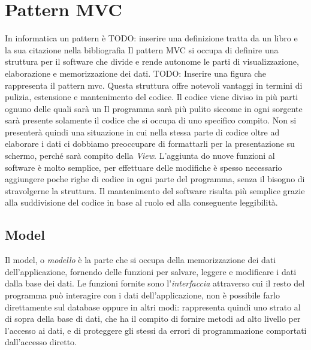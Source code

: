 \section{Pattern MVC}\label{sec:mvc}
In informatica un pattern è TODO: inserire una definizione tratta da un libro e la sua citazione nella bibliografia
Il pattern MVC si occupa di definire una struttura per il software che divide e rende autonome le parti di visualizzazione, elaborazione e memorizzazione dei dati.
TODO: Inserire una figura che rappresenta il pattern mvc.
Questa struttura offre notevoli vantaggi in termini di pulizia, estensione e mantenimento del codice. Il codice viene diviso in più parti ognuno delle quali sarà un Il programma sarà più pulito siccome in ogni sorgente sarà presente solamente il codice che si occupa di uno specifico compito. Non si presenterà quindi una situazione in cui nella stessa parte di codice oltre ad elaborare i dati ci dobbiamo preoccupare di formattarli per la presentazione su schermo, perché sarà compito della \emph{View}. L'aggiunta do nuove funzioni al software è molto semplice, per effettuare delle modifiche è spesso necessario aggiungere poche righe di codice in ogni parte del programma, senza il bisogno di stravolgerne la struttura. Il mantenimento del software risulta più semplice grazie alla suddivisione del codice in base al ruolo ed alla conseguente leggibilità.


\subsection{Model}
Il model, o \emph{modello} è la parte che si occupa della memorizzazione dei dati dell'applicazione, fornendo delle funzioni per salvare, leggere e modificare i dati dalla base dei dati. Le funzioni fornite sono l'\emph{interfaccia} attraverso cui il resto del programma può interagire con i dati dell'applicazione, non è possibile farlo direttamente sul database oppure in altri modi: rappresenta quindi uno strato al di sopra della base di dati, che ha il compito di fornire metodi ad alto livello per l'accesso ai dati, e di proteggere gli stessi da errori di programmazione comportati dall'accesso diretto.


